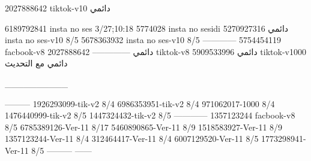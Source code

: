 2027888642 tiktok-v10
دائمي

6189792841 insta no ses
3/27;10:18
5774028 insta no sesidi
دائمي
5270927316 insta no ses-v10
8/5
5678363932 insta no ses-v10
8/5
------------
5754454119 facbook-v8
دائمي
--------------
2027888642 tiktok-v8
دائمي
5909533996 tiktok-v1000
دائمي مع التحديث

__________

---------
1926293099-tik-v2
8/4
6986353951-tik-v2
8/4
971062017-1000
8/4
1476440999-tik-v2
8/5
1447324432-tik-v2
8/5
------------
1357123244 facbook-v8
8/5
6785389126-Ver-11
8/17
5460890865-Ver-11
8/9
1518583927-Ver-11
8/9
1357123244-Ver-11
8/4
312464417-Ver-11
8/4
6007129520-Ver-11
8/5
1773298941-Ver-11
8/5
---------
------
